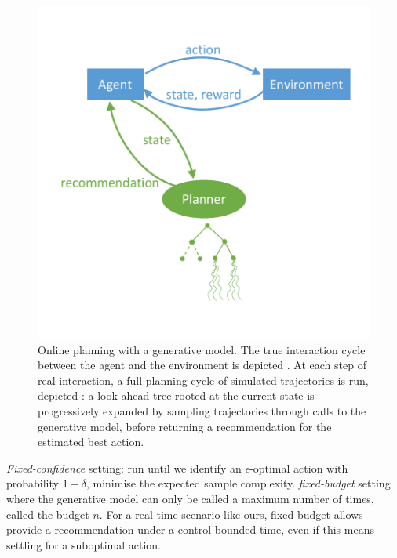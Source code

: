 \begin{figure}[ht]
	\centering
	\includegraphics[trim = {0 1.3cm 0 1.3cm}, clip, width=0.7\linewidth]{img/online_planning}
	\caption{Online planning with a generative model. The true interaction cycle between the agent and the environment is depicted . At each step of real interaction, a full planning cycle of simulated trajectories is run, depicted : a look-ahead tree rooted at the current state is progressively expanded by sampling trajectories through calls to the generative model, before returning a recommendation for the estimated best action.}
	\label{fig:online-planning}
\end{figure}

\emph{Fixed-confidence} setting: run until we identify an $\epsilon$-optimal action with probability $1-\delta$, minimise the expected sample complexity.
\emph{fixed-budget} setting where the generative model can only be called a maximum number of times, called the budget $n$. 
For a real-time scenario like ours, fixed-budget allows provide a recommendation under a control bounded time, even if this means settling for a suboptimal action.

